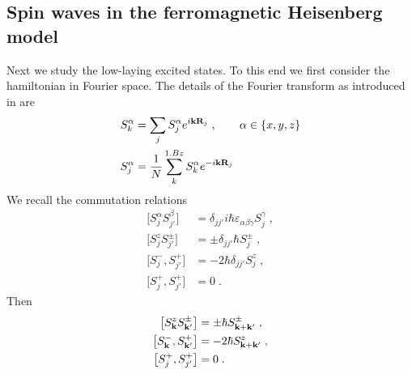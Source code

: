 \subsection{Spin waves in the ferromagnetic Heisenberg model}
%
Next we study the low-laying excited states. To this end we 
first consider the  hamiltonian in  Fourier space. 
The details of the 
Fourier transform as introduced in  are
\begin{subequations}\label{eq:FT:magnetism2}
\begin{align}
S_{k}^{\alpha} &= \sum_{j} S_{j}^{\alpha} e^{i \mathbf k \mathbf R_{j}}\;,\qquad \alpha\in\{x,y,z\}\\
S_{j}^{\alpha}&=\frac{1}{N} \sum_{k}^{1.Bz} S_{k}^{\alpha} e^{-i \mathbf k \mathbf R_{j}}
\end{align}
\end{subequations}
%
We recall the commutation relations 
%
\begin{subequations}\label{eq:}
\begin{align}
\big[ S_{j}^{\alpha}S_{j'}^{\beta}	 \big] &= \delta_{jj'}
i \hbar \varepsilon_{\alpha\beta\gamma}S_{j}^{\gamma}\;,\\
\big[S_{j}^{z} S^{\pm}_{j'}\big] &=\pm \delta_{jj'} \hbar S^{\pm}_{j}\;,\\
\big[S^{-}_{j},S^{+}_{j'}\big] 
&= -2 \hbar \delta_{jj'} S^{z}_{j}\;,\\
\big[S^{+}_{j},S^{+}_{j'}\big]  &= 0\;.
\end{align}
\end{subequations}
Then
%
\begin{subequations}\label{eq:}
\begin{align}
\big[S_{\mathbf k}^{z} S^{\pm}_{\mathbf k'}\big] 
&=\pm  \hbar S^{\pm}_{\mathbf k+\mathbf k'}\;,\\
\big[S^{-}_{\mathbf k},S^{+}_{\mathbf k'}\big] 
&= -2 \hbar S^{z}_{\mathbf k +\mathbf k'}\;,\\
\big[S^{+}_{j},S^{+}_{j'}\big]  &= 0\;.
\end{align}
\end{subequations}



